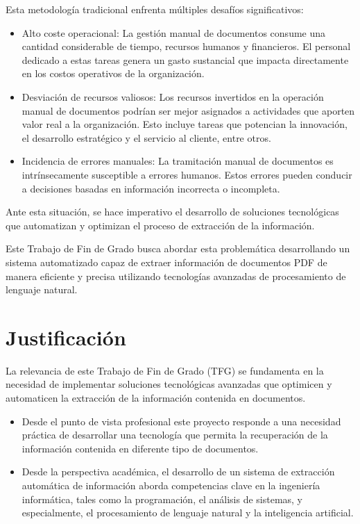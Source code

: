 Esta metodología tradicional enfrenta múltiples desafíos significativos:

\begin{itemize}
    \item Alto coste operacional: La gestión manual de documentos consume una cantidad considerable de tiempo, recursos humanos y financieros. El personal dedicado a estas tareas genera un gasto sustancial que impacta directamente en los costos operativos de la organización.
    \item Desviación de recursos valiosos: Los recursos invertidos en la operación manual de documentos podrían ser mejor asignados a actividades que aporten valor real a la organización. Esto incluye tareas que potencian la innovación, el desarrollo estratégico y el servicio al cliente, entre otros.
    \item Incidencia de errores manuales: La tramitación manual de documentos es intrínsecamente susceptible a errores humanos. Estos errores pueden conducir a decisiones basadas en información incorrecta o incompleta.
\end{itemize}

Ante esta situación, se hace imperativo el desarrollo de soluciones tecnológicas que automatizan y optimizan el proceso de extracción de la información.

Este Trabajo de Fin de Grado busca abordar esta problemática desarrollando un sistema automatizado capaz de extraer información de documentos PDF de manera eficiente y precisa utilizando tecnologías avanzadas de procesamiento de lenguaje natural.

\section*{Justificación}
La relevancia de este Trabajo de Fin de Grado (TFG) se fundamenta en la necesidad de implementar soluciones tecnológicas avanzadas que optimicen y automaticen la extracción de la información contenida en documentos.

\begin{itemize}
    \item Desde el punto de vista profesional este proyecto responde a una necesidad práctica de desarrollar una tecnología que permita la recuperación de la información contenida en diferente tipo de documentos.
    \item Desde la perspectiva académica, el desarrollo de un sistema de extracción automática de información aborda competencias clave en la ingeniería informática, tales como la programación, el análisis de sistemas, y especialmente, el procesamiento de lenguaje natural y la inteligencia artificial.
\end{itemize}

